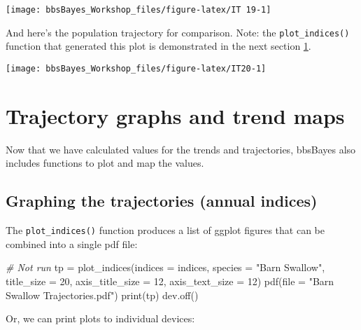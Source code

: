 \documentclass[
]{book}
\newenvironment{Shaded}{\begin{snugshade}}{\end{snugshade}}
\newcommand{\AttributeTok}[1]{\textcolor[rgb]{0.77,0.63,0.00}{#1}}
\newcommand{\CommentTok}[1]{\textcolor[rgb]{0.56,0.35,0.01}{\textit{#1}}}
\newcommand{\DecValTok}[1]{\textcolor[rgb]{0.00,0.00,0.81}{#1}}
\newcommand{\FunctionTok}[1]{\textcolor[rgb]{0.00,0.00,0.00}{#1}}
\newcommand{\NormalTok}[1]{#1}
\newcommand{\OtherTok}[1]{\textcolor[rgb]{0.56,0.35,0.01}{#1}}
\newcommand{\StringTok}[1]{\textcolor[rgb]{0.31,0.60,0.02}{#1}}
\begin{document}
\begin{center}\texttt{[image: bbsBayes\_Workshop\_files/figure-latex/IT 19-1]} \end{center}

And here's the population trajectory for comparison. Note: the \texttt{plot\_indices()} function that generated this plot is demonstrated in the next section \ref{GraphMap}.

\begin{center}\texttt{[image: bbsBayes\_Workshop\_files/figure-latex/IT20-1]} \end{center}

\hypertarget{GraphMap}{%
\chapter{Trajectory graphs and trend maps}\label{GraphMap}}

Now that we have calculated values for the trends and trajectories, bbsBayes also includes functions to plot and map the values.

\hypertarget{graphing-the-trajectories-annual-indices}{%
\section{Graphing the trajectories (annual indices)}\label{graphing-the-trajectories-annual-indices}}

The \texttt{plot\_indices()} function produces a list of ggplot figures that can be combined into a single pdf file:

\begin{Shaded}
\begin{Highlighting}[]
\CommentTok{\# Not run}
\NormalTok{tp }\OtherTok{=} \FunctionTok{plot\_indices}\NormalTok{(}\AttributeTok{indices =}\NormalTok{ indices,}
                         \AttributeTok{species =} \StringTok{"Barn Swallow"}\NormalTok{,}
                  \AttributeTok{title\_size =} \DecValTok{20}\NormalTok{,}
                  \AttributeTok{axis\_title\_size =} \DecValTok{12}\NormalTok{,}
                  \AttributeTok{axis\_text\_size =} \DecValTok{12}\NormalTok{)}
\FunctionTok{pdf}\NormalTok{(}\AttributeTok{file =} \StringTok{"Barn Swallow Trajectories.pdf"}\NormalTok{)}
\FunctionTok{print}\NormalTok{(tp)}
\FunctionTok{dev.off}\NormalTok{()}
\end{Highlighting}
\end{Shaded}

Or, we can print plots to individual devices:
\end{document}
